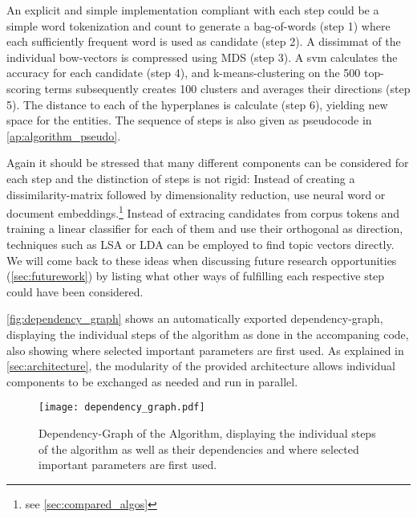  An explicit and simple implementation compliant with each step could be a simple word tokenization and count to generate a bag-of-words (step 1) where each sufficiently frequent word is used as candidate (step 2). A \gls{dissimmat} of the individual \gls{bow}-vectors is compressed using MDS (step 3). A \gls{svm} calculates the accuracy for each candidate (step 4), and k-means-clustering on the 500 top-scoring terms subsequently creates 100 clusters and averages their directions (step 5). The distance to each of the hyperplanes is calculate (step 6), yielding new space for the entities. The sequence of steps is also given as pseudocode in \autoref{ap:algorithm_pseudo}. 
 
 Again it should be stressed that many different components can be considered for each step and the distinction of steps is not rigid: Instead of creating a dissimilarity-matrix followed by dimensionality reduction, \cite{Ager2018,Alshaikh2020} use neural word or document embeddings.\footnote{see \autoref{sec:compared_algos}} Instead of extracing candidates from corpus tokens and training a linear classifier for each of them and use their orthogonal as direction, techniques such as LSA or LDA can be employed to find topic vectors directly. We will come back to these ideas when discussing future research opportunities (\autoref{sec:futurework}) by listing what other ways of fulfilling each respective step could have been considered.

\autoref{fig:dependency_graph} shows an automatically exported dependency-graph, displaying the individual steps of the algorithm as done in the accompaning code, also showing where selected important parameters are first used. As explained in \autoref{sec:architecture}, the modularity of the provided architecture allows individual components to be exchanged as needed and run in parallel.


\begin{figure}[H]
	\begin{center}
	  \texttt{[image: dependency\_graph.pdf]}
	  \caption[Dependency-Graph of the Algorithm]{Dependency-Graph of the Algorithm, displaying the individual steps of the algorithm as well as their dependencies and where selected important parameters are first used. }
	  \label{fig:dependency_graph}
	\end{center}
\end{figure}



